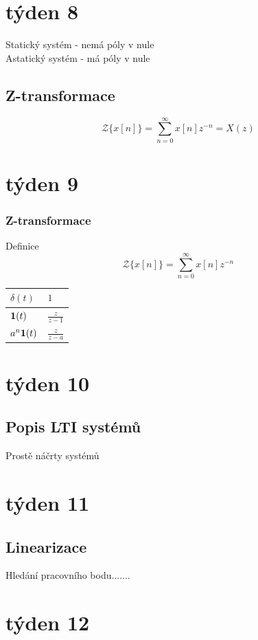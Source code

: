 \documentclass{article}
\begin{document}
\section*{týden 8}
	Statický systém - nemá póly v nule\\
	Astatický systém - má póly v nule
	\subsection*{Z-transformace}
	\[\mathcal{Z}\{x[n]\}=\sum_{n=0}^{\infty}x[n]z^{-n}=X(z)\]






\section*{týden 9}
	\subsubsection*{Z-transformace}
		Definice
		\[\mathcal{Z}\{x[n]\}=\sum_{n=0}^{\infty}x[n]z^{-n}\]

	{\Large
	\begin{center}
		\begin{tabular}{| m{15em} | m{5em}|}\hline
			$\delta(t)$&$1$\\\hline
			${\bf 1}(t)$&$\frac{z}{z-1}$\\\hline
			$a^n{\bf 1}(t)$&$\frac{z}{z-a}$\\\hline
		\end{tabular}
	\end{center}
	}
\section*{týden 10}
	\subsection*{Popis LTI systémů}
		Prostě náčrty systémů
\section*{týden 11}
	\subsection*{Linearizace}
		Hledání pracovního bodu.......
\section*{týden 12}
\end{document}
